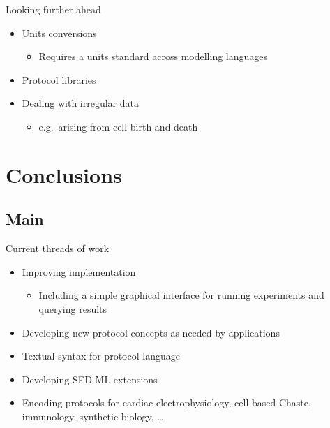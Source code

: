 \documentclass[t,xcolor={usenames,dvipsnames}]{beamer}
\newcommand{\subitem}[1]{\begin{itemize}[<.->]\item #1 \end{itemize}}
\begin{document}
\begin{frame}{Looking further ahead}
\begin{itemize}[<+->]
\item Units conversions
  \subitem{Requires a units standard across modelling languages}
\item Protocol libraries
\item Dealing with irregular data
  \subitem{e.g.\ arising from cell birth and death}
\end{itemize}
\end{frame}

\section{Conclusions}
\subsection*{Main}

\begin{frame}{Current threads of work}
\begin{itemize}
\item Improving implementation
  \subitem{Including a simple graphical interface for running experiments and querying results}
\item Developing new protocol concepts as needed by applications
\item Textual syntax for protocol language
\item Developing SED-ML extensions
\item Encoding protocols for cardiac electrophysiology, cell-based Chaste, immunology, synthetic biology, \ldots
\end{itemize}
\end{frame}
\end{document}
